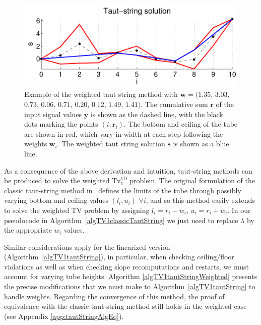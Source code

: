 \documentclass[twoside,11pt]{article}
\newcommand{\vr}{\bm{r}}       \newcommand{\vrh}{\hat{\bm{r}}}        \newcommand{\rh}{\hat{r}}    \newcommand{\vrt}{\tilde{\bm{r}}}       \newcommand{\rt}{\tilde{r}}
\newcommand{\vs}{\bm{s}}       \newcommand{\vsh}{\hat{\bm{s}}}        \newcommand{\sh}{\hat{s}}    \newcommand{\vst}{\tilde{\bm{s}}}       \newcommand{\st}{\tilde{s}}
\newcommand{\vw}{\bm{w}}       \newcommand{\vwh}{\hat{\bm{w}}}        \newcommand{\wh}{\hat{w}}    \newcommand{\vwt}{\tilde{\bm{w}}}       \newcommand{\wt}{\tilde{w}}
\newcommand{\vy}{\bm{y}}       \newcommand{\vyh}{\hat{\bm{y}}}        \newcommand{\yh}{\hat{y}}    \newcommand{\vyt}{\tilde{\bm{y}}}       \newcommand{\yt}{\tilde{y}}
\newcommand{\tvell}{\text{Tv}}
\newcommand{\oned}{\text{1D}}
\numberwithin{equation}{section}
\numberwithin{theorem}{section}
\begin{document}
\begin{figure}[ht]
  \centering
  \includegraphics[width = \textwidth]{tautStringWeightedExample}
  \caption{\small Example of the weighted taut string method with $\vw=(1.35$, $3.03$, $0.73$, $0.06$, $0.71$, $0.20$, $0.12$, $1.49$, $1.41)$. The cumulative sum $\vr$ of the input signal values $\vy$ is shown as the dashed line, with the black dots marking the points $(i,\vr_i)$. The bottom and ceiling of the tube are shown in red, which vary in width at each step following the weights $\vw_i$. The weighted taut string solution $\vs$ is shown as a blue line.
   }   \label{fig:tautStringWeightedExample}
\end{figure}

As a consequence of the above derivation and intuition, taut-string methods can be produced to solve the weighted $\tvell_1^{\oned}$ problem. The original formulation of the classic taut-string method in~\citep{daviesTautString} defines the limits of the tube through possibly varying bottom and ceiling values $(l_i, u_i)$ $\forall i$, and so this method easily extends to solve the weighted TV problem by assigning $l_i = r_i - w_i$, $u_i = r_i + w_i$. In our pseudocode in Algorithm~\ref{algTV1classicTautString} we just need to replace $\lambda$ by the appropriate $w_i$ values.

Similar considerations apply for the linearized version (Algorithm~\ref{algTV1tautString}), in particular, when checking ceiling/floor violations as well as when checking slope recomputations and restarts, we must account for varying tube heights. Algorithm \ref{algTV1tautStringWeighted} presents the precise modifications that we must make to Algorithm~\ref{algTV1tautString} to handle weights. Regarding the convergence of this method, the proof of equivalence with the classic taut-string method still holds in the weighted case (see Appendix \ref{app:tautStringAlgEq}).
\end{document}
